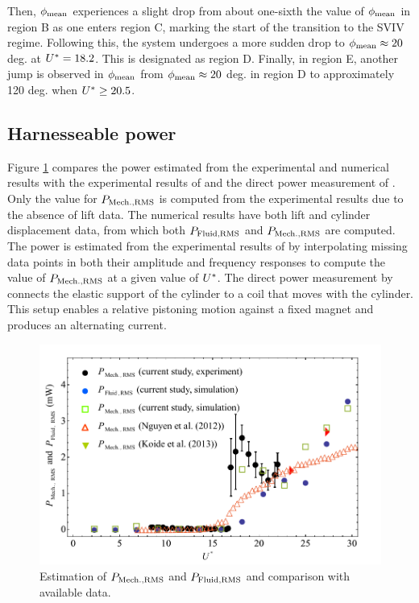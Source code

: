 \documentclass[oneside]{utmthesis}
\begin{document}
Then, $\phi_{\text{mean}}$ experiences a slight drop from about one-sixth the value of $\phi_{\text{mean}}$ in region B as one enters region C, marking the start of the transition to the SVIV regime. Following this, the system undergoes a more sudden drop to $\phi_{\text{mean}} \approx 20$ deg. at $U^{*} = 18.2$. This is designated as region D. Finally, in region E, another jump is observed in $\phi_{\text{mean}}$ from $\phi_{\text{mean}} \approx 20$ deg. in region D to approximately 120 deg. when $U^{*} \geq 20.5$.

\subsection{Harnesseable power} \label{ssec:mathModel}
Figure \ref{fig:powerComparison} compares the power estimated from the experimental and numerical results with the experimental results of \citet{Nguyen2012} and the direct power measurement of \citet{Koide2013}. Only the value for $P_{\text{Mech.,RMS}}$ is computed from the experimental results due to the absence of lift data. The numerical results have both lift and cylinder displacement data, from which both $P_{\text{Fluid,RMS}}$ and $P_{\text{Mech.,RMS}}$ are computed. The power is estimated from the experimental results of \citet{Nguyen2012} by interpolating missing data points in both their amplitude and frequency responses to compute the value of $P_{\text{Mech.,RMS}}$ at a given value of $U^{*}$. The direct power measurement by \citet{Koide2013} connects the elastic support of the cylinder to a coil that moves with the cylinder. This setup enables a relative pistoning motion against a fixed magnet and produces an alternating current.

\begin{figure}
  \centering
  \includegraphics[width=1\textwidth]{figs/powerComparison}
  \caption{Estimation of $P_{\text{Mech.,RMS}}$ and $P_{\text{Fluid,RMS}}$ and comparison with available data.}
  \label{fig:powerComparison}
\end{figure}
\end{document}
